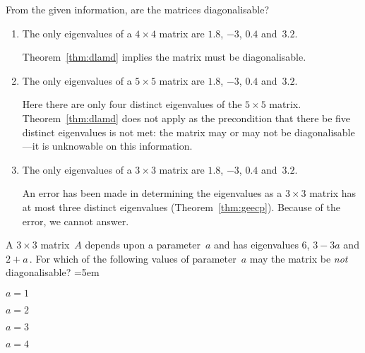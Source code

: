 \begin{example} \label{eg:}
From the given information, are the matrices diagonalisable?
\begin{enumerate}
\item The only eigenvalues of a \(4\times 4\) matrix are \(1.8\), \(-3\), \(0.4\) and~\(3.2\).
\begin{solution} 
Theorem~\ref{thm:dlamd} implies the matrix must be diagonalisable.
\end{solution}

\item The only eigenvalues of a \(5\times 5\) matrix are \(1.8\), \(-3\), \(0.4\) and~\(3.2\).
\begin{solution} 
Here there are only four distinct eigenvalues of the \(5\times5\) matrix.
Theorem~\ref{thm:dlamd} does not apply as the precondition that there be five distinct eigenvalues is not met: the matrix may or may not be diagonalisable---it is unknowable on this information.
\end{solution}

\item The only eigenvalues of a \(3\times 3\) matrix are \(1.8\), \(-3\), \(0.4\) and~\(3.2\).
\begin{solution} 
An error has been made in determining the eigenvalues as a \(3\times3\) matrix has at most three distinct eigenvalues (Theorem~\ref{thm:geecp}).
Because of the error, we cannot answer.
\end{solution}

\end{enumerate}
\end{example}



\begin{activity}
A \(3\times3\) matrix~\(A\) depends upon a parameter~\(a\) and has eigenvalues \(6\), \(3-3a\) and \(2+a\)\,.
For which of the following values of parameter~\(a\) may the matrix be \emph{not} diagonalisable?
\partswidth=5em
\begin{parts}
\item \(a=1\)
\item \(a=2\)
\item \(a=3\)
\item \(a=4\)\actans
\end{parts}
\end{activity}





